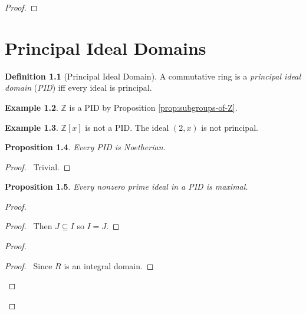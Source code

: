 \documentclass{book}
\let\qed\relax
\newtheorem{prop}{Proposition}[chapter]
\theoremstyle{definition}
\newtheorem{df}[prop]{Definition}
\newtheorem{ex}[prop]{Example}
\newcommand{\inv}[1]{\ensuremath{{#1}^{-1}}}
\begin{document}
\begin{proof}
\pf
{}
\step{3}{\pflet{$\inv{\phi}(I) = (a_1, \ldots, a_n)$}}
\qed
\end{proof}

\chapter{Principal Ideal Domains}

\begin{df}[Principal Ideal Domain]
A commutative ring is a \emph{principal ideal domain} (\emph{PID}) iff every ideal is principal.
\end{df}

\begin{ex}
$\mathbb{Z}$ is a PID by Proposition \ref{prop:subgroups-of-Z}.
\end{ex}

\begin{ex}
$\mathbb{Z}[x]$ is not a PID. The ideal $(2,x)$ is not principal.
\end{ex}

\begin{prop}
Every PID is Noetherian.
\end{prop}

\begin{proof}
\pf\ Trivial. \qed
\end{proof}

\begin{prop}
Every nonzero prime ideal in a PID is maximal.
\end{prop}

\begin{proof}
\pf
{}
\begin{proof}
	\pf\ Then $J \subseteq I$ so $I = J$.
\end{proof}
\begin{proof}
	\begin{proof}
		\pf\ Since $R$ is an integral domain.
	\end{proof}
\end{proof}
\qed
\end{proof}
\end{document}
